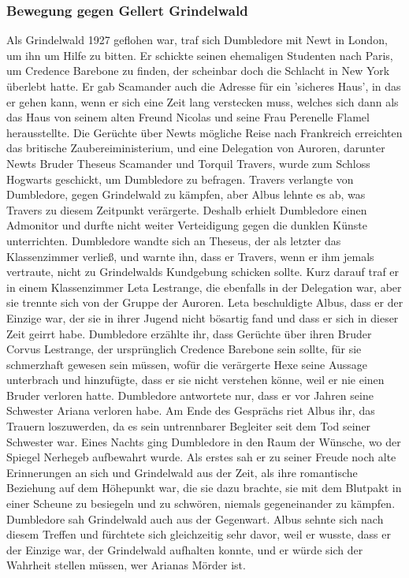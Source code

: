 \documentclass[a4paper, 10pt]{article}
\begin{document}
\subsubsection*{Bewegung gegen Gellert Grindelwald}
Als Grindelwald 1927 geflohen war, traf sich Dumbledore mit Newt in London, um ihn um Hilfe zu bitten. Er schickte seinen ehemaligen Studenten nach Paris, um Credence Barebone zu finden, der scheinbar doch die Schlacht in New York überlebt hatte. Er gab Scamander auch die Adresse für ein 'sicheres Haus', in das er gehen kann, wenn er sich eine Zeit lang verstecken muss, welches sich dann als das Haus von seinem alten Freund Nicolas und seine Frau Perenelle Flamel herausstellte.
\vspace{10pt}
\newline
{}  
Die Gerüchte über Newts mögliche Reise nach Frankreich erreichten das britische Zaubereiministerium, und eine Delegation von Auroren, darunter Newts Bruder Theseus Scamander und Torquil Travers, wurde zum Schloss Hogwarts geschickt, um Dumbledore zu befragen. Travers verlangte von Dumbledore, gegen Grindelwald zu kämpfen, aber Albus lehnte es ab, was Travers zu diesem Zeitpunkt verärgerte. Deshalb erhielt Dumbledore einen Admonitor und durfte nicht weiter Verteidigung gegen die dunklen Künste unterrichten. Dumbledore wandte sich an Theseus, der als letzter das Klassenzimmer verließ, und warnte ihn, dass er Travers, wenn er ihm jemals vertraute, nicht zu Grindelwalds Kundgebung schicken sollte.
\vspace{10pt}
\newline
{}  
Kurz darauf traf er in einem Klassenzimmer Leta Lestrange, die ebenfalls in der Delegation war, aber sie trennte sich von der Gruppe der Auroren. Leta beschuldigte Albus, dass er der Einzige war, der sie in ihrer Jugend nicht bösartig fand und dass er sich in dieser Zeit geirrt habe. Dumbledore erzählte ihr, dass Gerüchte über ihren Bruder Corvus Lestrange, der ursprünglich Credence Barebone sein sollte, für sie schmerzhaft gewesen sein müssen, wofür die verärgerte Hexe seine Aussage unterbrach und hinzufügte, dass er sie nicht verstehen könne, weil er nie einen Bruder verloren hatte. Dumbledore antwortete nur, dass er vor Jahren seine Schwester Ariana verloren habe. Am Ende des Gesprächs riet Albus ihr, das Trauern loszuwerden, da es sein untrennbarer Begleiter seit dem Tod seiner Schwester war.
\vspace{10pt}
\newline
{}  
Eines Nachts ging Dumbledore in den Raum der Wünsche, wo der Spiegel Nerhegeb aufbewahrt wurde. Als erstes sah er zu seiner Freude noch alte Erinnerungen an sich und Grindelwald aus der Zeit, als ihre romantische Beziehung auf dem Höhepunkt war, die sie dazu brachte, sie mit dem Blutpakt in einer Scheune zu besiegeln und zu schwören, niemals gegeneinander zu kämpfen. Dumbledore sah Grindelwald auch aus der Gegenwart. Albus sehnte sich nach diesem Treffen und fürchtete sich gleichzeitig sehr davor, weil er wusste, dass er der Einzige war, der Grindelwald aufhalten konnte, und er würde sich der Wahrheit stellen müssen, wer Arianas Mörder ist.
\end{document}
